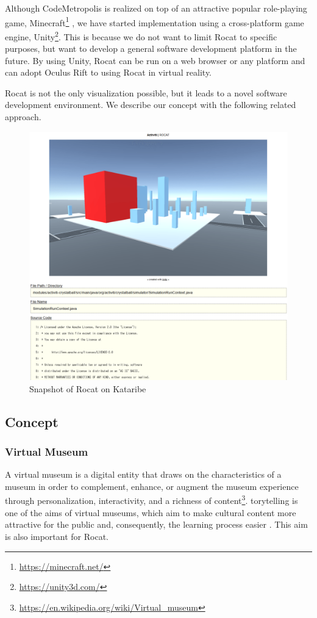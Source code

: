 \documentclass[conference]{IEEEtran}
\begin{document}
Although \textsf{CodeMetropolis} is realized on top of an attractive popular role-playing game,  \textsf{Minecraft}\footnote{\url{https://minecraft.net/}} \cite{6648194}, we have started implementation using a cross-platform game engine, \textsf{Unity}\footnote{\url{https://unity3d.com/}}.
This is because we do not want to limit \textsf{Rocat} to specific purposes, but want to develop a general software development platform in the future. 
By using \textsf{Unity}, \textsf{Rocat} can be run on a web browser or any platform and can adopt \textsf{Oculus Rift} to using \textsf{Rocat} in virtual reality.

\textsf{Rocat} is not the only visualization possible, but it leads to a novel software development environment.
We describe our concept with the following related approach.

\begin{figure}[tb]
\centering
\includegraphics[width=\linewidth]{Rocat-on-kataribe2.pdf}
\caption{Snapshot of \textsf{Rocat} on \textsf{Kataribe}}
\label{figure:Rocat-on-kataribe}
\end{figure}


\subsection{Concept}
\subsubsection{Virtual Museum}
A virtual museum is a digital entity that draws on the characteristics of a museum in order to complement, enhance, or augment the museum experience through personalization, interactivity, and a richness of content\footnote{\url{https://en.wikipedia.org/wiki/Virtual_museum}}.
torytelling is one of the aims of virtual museums, which aim to make cultural content more attractive for the public and, consequently, the learning process easier \cite{Pietroni:2014:IVR:2635823.2611375}.
This aim is also important for \textsf{Rocat}.
\end{document}
